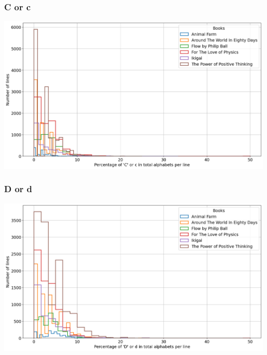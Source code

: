 \begin{frame}
    \frametitle{C or c}
    \begin{center}
        \hspace*{-5ex}
        \includegraphics[scale=0.35]{../01_programFiles/histograms/c.png}\hspace{10ex}
    \end{center}
\end{frame}

\begin{frame}
    \frametitle{D or d}
    \begin{center}
        \hspace*{-5ex}
        \includegraphics[scale=0.35]{../01_programFiles/histograms/d.png}\hspace{10ex}
    \end{center}
\end{frame}

